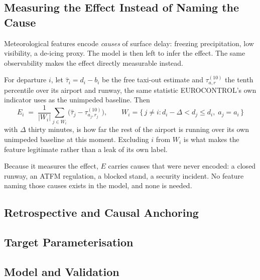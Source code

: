 \documentclass[
  manuscript=article,
  layout=preprint,
  year=2026,
  volume=x,
]{extra/joas}
\begin{document}
\subsection{Measuring the Effect Instead of Naming the Cause}
Meteorological features encode \emph{causes} of surface delay: freezing precipitation, low
visibility, a de-icing proxy. The model is then left to infer the effect. The same
observability makes the effect directly measurable instead.

For departure $i$, let $\hat{\tau}_i = d_i - b_i$ be the free taxi-out estimate and
$\tau^{(10)}_{a,r}$ the tenth percentile over its airport and runway, the same statistic
EUROCONTROL's own indicator uses as the unimpeded baseline. Then
\begin{equation}
E_i \;=\; \frac{1}{|W_i|}\sum_{j \in W_i}
          \bigl(\hat{\tau}_j - \tau^{(10)}_{a_j, r_j}\bigr),
\qquad
W_i = \{\, j \ne i : d_i - \Delta < d_j \le d_i,\; a_j = a_i \,\}
\end{equation}
with $\Delta$ thirty minutes, is how far the rest of the airport is running over its own
unimpeded baseline at this moment. Excluding $i$ from $W_i$ is what makes the feature
legitimate rather than a leak of its own label.

Because it measures the effect, $E$ carries causes that were never encoded: a closed
runway, an ATFM regulation, a blocked stand, a security incident. No feature naming those
causes exists in the model, and none is needed.

\subsection{Retrospective and Causal Anchoring}

\subsection{Target Parameterisation}

\subsection{Model and Validation}
\end{document}
